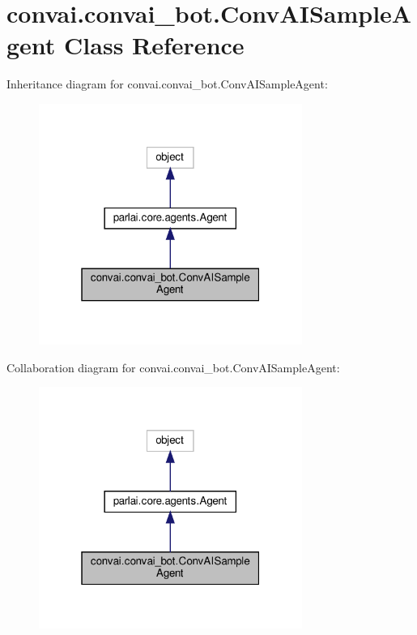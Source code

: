 \hypertarget{classconvai_1_1convai__bot_1_1ConvAISampleAgent}{}\section{convai.\+convai\+\_\+bot.\+Conv\+A\+I\+Sample\+Agent Class Reference}
\label{classconvai_1_1convai__bot_1_1ConvAISampleAgent}


Inheritance diagram for convai.\+convai\+\_\+bot.\+Conv\+A\+I\+Sample\+Agent\+:
\nopagebreak
\begin{figure}[H]
\begin{center}
\leavevmode
\includegraphics[width=244pt]{classconvai_1_1convai__bot_1_1ConvAISampleAgent__inherit__graph}
\end{center}
\end{figure}


Collaboration diagram for convai.\+convai\+\_\+bot.\+Conv\+A\+I\+Sample\+Agent\+:
\nopagebreak
\begin{figure}[H]
\begin{center}
\leavevmode
\includegraphics[width=244pt]{classconvai_1_1convai__bot_1_1ConvAISampleAgent__coll__graph}
\end{center}
\end{figure}

